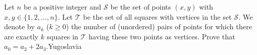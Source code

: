 Let $n$ be a positive integer and $\mathcal S$ be the set of points $(x, y)$ with $x, y \in \{1, 2, \ldots , n\}$. Let $\mathcal T$ be the set of all squares with vertices in the set $\mathcal S$. We denote by $a_k$ ($k \geq 0$) the number of (unordered) pairs of points for which there are exactly $k$ squares in $\mathcal T$ having these two points as vertices. Prove that $a_0 = a_2 + 2a_3$.Yugoslavia